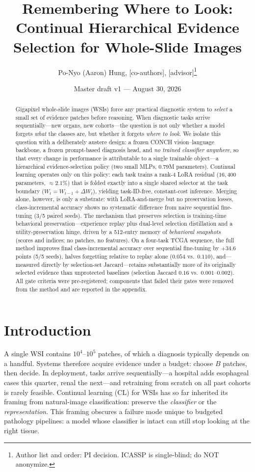 \documentclass[11pt]{article}
\title{Remembering Where to Look:\\ Continual Hierarchical Evidence Selection for Whole-Slide Images}
\author{Po-Nyo (Aaron) Hung, [co-authors], [advisor]\thanks{Author list and order: PI decision. ICASSP is single-blind; do NOT anonymize.}}
\date{Master draft v1 --- August 30, 2026}
\begin{document}
\maketitle

\begin{abstract}
Gigapixel whole-slide images (WSIs) force any practical diagnostic system to \emph{select} a small set of evidence patches before reasoning. When diagnostic tasks arrive sequentially---new organs, new cohorts---the question is not only whether a model forgets \emph{what} the classes are, but whether it forgets \emph{where to look}. We isolate this question with a deliberately austere design: a frozen CONCH vision--language backbone, a frozen prompt-based diagnosis head, and \emph{no trained classifier anywhere}, so that every change in performance is attributable to a single trainable object---a hierarchical evidence-selection policy (two small MLPs, 0.79M parameters). Continual learning operates only on this policy: each task trains a rank-4 LoRA residual ($16{,}400$ parameters, ${\approx}2.1\%$) that is folded exactly into a single shared selector at the task boundary ($W_t = W_{t-1} + \Delta W_t$), yielding task-ID-free, constant-cost inference. Merging alone, however, is only a substrate: with LoRA-and-merge but no preservation losses, class-incremental accuracy shows no systematic difference from naive sequential fine-tuning (3/5 paired seeds). The mechanism that preserves selection is training-time behavioral preservation---experience replay plus dual-level selection distillation and a utility-preservation hinge, driven by a 512-entry memory of \emph{behavioral snapshots} (scores and indices; no patches, no features). On a four-task TCGA sequence, the full method improves final class-incremental accuracy over sequential fine-tuning by $+34.6$ points (5/5 seeds), halves forgetting relative to replay alone ($0.054$ vs.\ $0.110$), and---measured directly by selection-set Jaccard---retains substantially more of its originally selected evidence than unprotected baselines (selection Jaccard $0.16$ vs.\ $0.001$--$0.002$). All gate criteria were pre-registered; components that failed their gates were removed from the method and are reported in the appendix.
\end{abstract}

\section{Introduction}
A single WSI contains $10^4$--$10^5$ patches, of which a diagnosis typically depends on a handful. Systems therefore acquire evidence under a budget: choose $B$ patches, then decide. In deployment, tasks arrive sequentially---a hospital adds esophageal cases this quarter, renal the next---and retraining from scratch on all past cohorts is rarely feasible. Continual learning (CL) for WSIs has so far inherited its framing from natural-image classification: preserve the \emph{classifier} or the \emph{representation}. This framing obscures a failure mode unique to budgeted pathology pipelines: a model whose classifier is intact can still stop looking at the right tissue.
\end{document}
